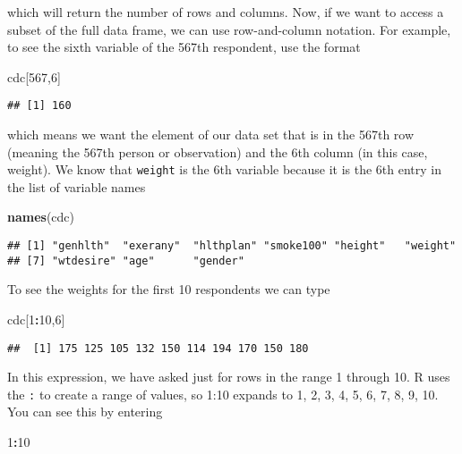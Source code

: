 \documentclass[]{article}
\newenvironment{Shaded}{\begin{snugshade}}{\end{snugshade}}
\newcommand{\KeywordTok}[1]{\textcolor[rgb]{0.13,0.29,0.53}{\textbf{#1}}}
\newcommand{\DecValTok}[1]{\textcolor[rgb]{0.00,0.00,0.81}{#1}}
\newcommand{\OperatorTok}[1]{\textcolor[rgb]{0.81,0.36,0.00}{\textbf{#1}}}
\newcommand{\NormalTok}[1]{#1}
\begin{document}
which will return the number of rows and columns. Now, if we want to
access a subset of the full data frame, we can use row-and-column
notation. For example, to see the sixth variable of the 567th
respondent, use the format

\begin{Shaded}
\begin{Highlighting}[]
\NormalTok{cdc[}\DecValTok{567}\NormalTok{,}\DecValTok{6}\NormalTok{]}
\end{Highlighting}
\end{Shaded}

\begin{verbatim}
## [1] 160
\end{verbatim}

which means we want the element of our data set that is in the 567th row
(meaning the 567th person or observation) and the 6th column (in this
case, weight). We know that \texttt{weight} is the 6th variable because
it is the 6th entry in the list of variable names

\begin{Shaded}
\begin{Highlighting}[]
\KeywordTok{names}\NormalTok{(cdc)}
\end{Highlighting}
\end{Shaded}

\begin{verbatim}
## [1] "genhlth"  "exerany"  "hlthplan" "smoke100" "height"   "weight"  
## [7] "wtdesire" "age"      "gender"
\end{verbatim}

To see the weights for the first 10 respondents we can type

\begin{Shaded}
\begin{Highlighting}[]
\NormalTok{cdc[}\DecValTok{1}\OperatorTok{:}\DecValTok{10}\NormalTok{,}\DecValTok{6}\NormalTok{]}
\end{Highlighting}
\end{Shaded}

\begin{verbatim}
##  [1] 175 125 105 132 150 114 194 170 150 180
\end{verbatim}

In this expression, we have asked just for rows in the range 1 through
10. R uses the \texttt{:} to create a range of values, so 1:10 expands
to 1, 2, 3, 4, 5, 6, 7, 8, 9, 10. You can see this by entering

\begin{Shaded}
\begin{Highlighting}[]
\DecValTok{1}\OperatorTok{:}\DecValTok{10}
\end{Highlighting}
\end{Shaded}
\end{document}
